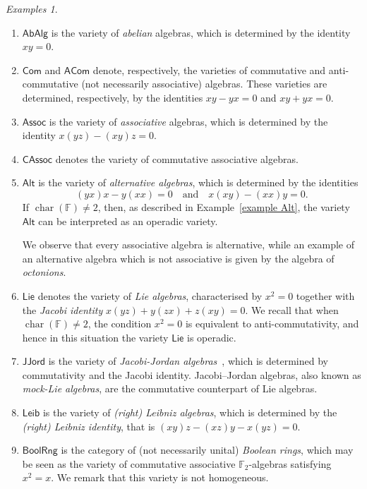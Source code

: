 \documentclass[reqno,a4paper]{amsart}
\theoremstyle{plain}
\theoremstyle{definition}
\theoremstyle{remark}
\newtheorem{examples}[subsection]{Examples}
\numberwithin{equation}{section}
\newcommand{\F}{\mathbb{F}}
\DeclareMathOperator{\bchar}{char}
\newcommand{\Assoc}{\ensuremath{\mathsf{Assoc}}}
\newcommand{\Lie}{\ensuremath{\mathsf{Lie}}}
\newcommand{\Leib}{\ensuremath{\mathsf{Leib}}}
\newcommand{\BoolRng}{\ensuremath{\mathsf{BoolRng}}}
\newcommand{\CAssoc}{\ensuremath{\mathsf{CAssoc}}}
\newcommand{\Com}{\ensuremath{\mathsf{Com}}}
\newcommand{\ACom}{\ensuremath{\mathsf{ACom}}}
\newcommand{\JJord}{\ensuremath{\mathsf{JJord}}}
\newcommand{\AbAlg}{\ensuremath{\mathsf{AbAlg}}}
\newcommand{\Alt}{\ensuremath{\mathsf{Alt}}}
\begin{document}
\begin{examples}\label{Examples varieties}{\ }
\begin{enumerate}
\item $\AbAlg$ is the variety of \emph{abelian} algebras, which is determined by the identity~$xy=0$.

\item $\Com$ and $\ACom$ denote, respectively, the varieties of commutative and anti-commutative (not necessarily associative) algebras. These varieties are determined, respectively, by the identities $xy-yx=0$ and $xy+yx=0$.

\item $\Assoc$ is the variety of \emph{associative} algebras, which is determined by the identity $x(yz)-(xy)z=0$.

\item $\CAssoc$ denotes the variety of commutative associative algebras.

\item $\Alt$ is the variety of \emph{alternative algebras}, which is determined by the identities
\[
(yx)x-y(xx)=0 \quad \text{and} \quad x(xy)-(xx)y=0.
\]
If $\bchar(\F) \neq 2$, then, as described in Example~\ref{example Alt}, the variety $\Alt$ can be interpreted as an operadic variety.

We observe that every associative algebra is alternative, while an example of an alternative algebra which is not associative is given by the algebra of \emph{octonions}.

\item $\Lie$ denotes the variety of \emph{Lie algebras}, characterised by $x^2=0$ together with the \emph{Jacobi identity} $x(yz)+y(zx)+z(xy)=0$. We recall that when $\bchar(\F) \neq 2$, the condition $x^2=0$ is equivalent to anti-commutativity, and hence in this situation the variety $\Lie$ is operadic.

\item $\JJord$ is the variety of \emph{Jacobi-Jordan algebras}~\cite{Burde}, which is determined by commutativity and the Jacobi identity. Jacobi–Jordan algebras, also known as \emph{mock-Lie algebras}, are the commutative counterpart of Lie algebras. 

\item $\Leib$ is the variety of \emph{(right) Leibniz algebras}, which is determined by the \emph{(right) Leibniz identity}, that is $(xy)z-(xz)y-x(yz)=0$.

\item $\BoolRng$ is the category of (not necessarily unital) \emph{Boolean rings}, which may be seen as the variety of commutative associative $\F_2$-algebras satisfying $x^2=x$. We remark that this variety is not homogeneous.


\end{enumerate}
\end{examples}
\end{document}
